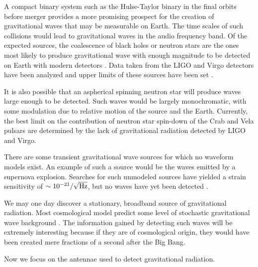A compact binary system such as the Hulse-Taylor binary in the final orbits before merger provides a more promising prospect for the creation of gravitational waves that may be measurable on Earth. %
The time scales of such collisions would lead to gravitational waves in the audio frequency band. %
Of the expected sources, the coalescence of black holes or neutron stars are the ones most likely to produce gravitational wave with enough magnitude to be detected on Earth with modern detectors \cite{CBCrates}. %
Data taken from the LIGO and Virgo detectors have been analyzed and upper limits of these sources have been set \cite{CBC,CBCblackholes}.

It is also possible that an aspherical spinning neutron star will produce waves large enough to be detected. %
Such waves would be largely monochromatic, with some modulation due to relative motion of the source and the Earth. %
Currently, the best limit on the contribution of neutron star spin-down of the Crab\cite{Crab} and Vela\cite{Vela} pulsars are determined by the lack of gravitational radiation detected by LIGO and Virgo.

There are some transient gravitational wave sources for which no waveform models exist. %
An example of such a source would be the waves emitted by a supernova explosion. %
Searches for such unmodeled sources have yielded a strain sensitivity of $\sim 10^{-21} / \sqrt{\rm{Hz}}$, but no waves have yet been detected \cite{bursts}.

We may one day discover a stationary, broadband source of gravitational radiation. %
Most cosmological model predict some level of stochastic gravitational wave background \cite{bbn,stochdirectional}. %
The information gained by detecting such waves will be extremely interesting because if they are of cosmological origin, they would have been created mere fractions of a second after the Big Bang.

Now we focus on the antennae used to detect gravitational radiation.
